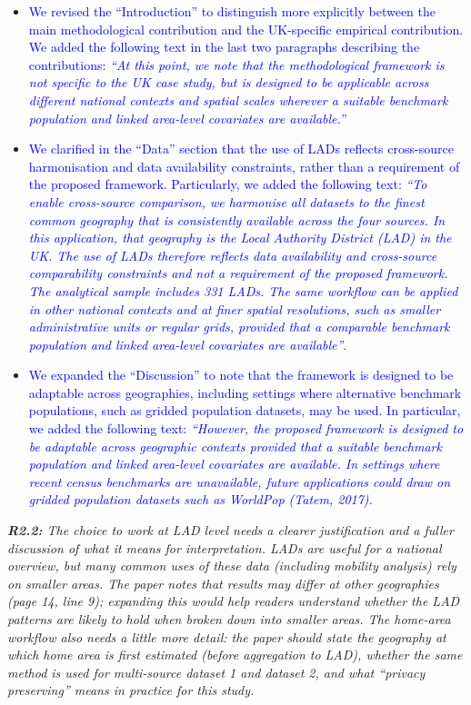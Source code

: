 \documentclass[
  letterpaper,
  DIV=11,
  numbers=noendperiod]{scrartcl}
\begin{document}
\vspace{-3mm} \begin{itemize}[noitemsep, topsep=0pt]
\item \textcolor{blue}{ We revised the ``Introduction'' to distinguish more explicitly between the main methodological contribution and the UK-specific empirical contribution. We added the following text in the last two paragraphs describing the contributions: \textit{``At this point, we note that the methodological framework is not specific to the UK case study, but is designed to be applicable across different national contexts and spatial scales wherever a suitable benchmark population and linked area-level covariates are available.''}}
\item \textcolor{blue}{We clarified in the ``Data'' section that the use of LADs reflects cross-source harmonisation and data availability constraints, rather than a requirement of the proposed framework. Particularly, we added the following text: \textit{``To enable cross-source comparison, we harmonise all datasets to the finest common geography that is consistently available across the four sources. In this application, that geography is the Local Authority District (LAD) in the UK. The use of LADs therefore reflects data availability and cross-source comparability constraints and not a requirement of the proposed framework. The analytical sample includes 331 LADs. The same workflow can be applied in other national contexts and at finer spatial resolutions, such as smaller administrative units or regular grids, provided that a comparable benchmark population and linked area-level covariates are available''}.}
\item \textcolor{blue}{We expanded the ``Discussion'' to note that the framework is designed to be adaptable across geographies, including settings where alternative benchmark populations, such as gridded population datasets, may be used. In particular, we added the following text: \textit{``However, the proposed framework is designed to be adaptable across geographic contexts provided that a suitable benchmark population and linked area-level covariates are available. In settings where recent census benchmarks are unavailable, future applications could draw on gridded population datasets such as WorldPop (Tatem, 2017).}}
\end{itemize}

\setlength{\leftskip}{0cm}\textit{\textbf{R2.2:} The choice to work at LAD level needs a clearer justification and a fuller discussion of what it means for interpretation. LADs are useful for a national overview, but many common uses of these data (including mobility analysis) rely on smaller areas. The paper notes that results may differ at other geographies (page 14, line 9); expanding this would help readers understand whether the LAD patterns are likely to hold when broken down into smaller areas. The home-area workflow also needs a little more detail: the paper should state the geography at which home area is first estimated (before aggregation to LAD), whether the same method is used for multi-source dataset 1 and dataset 2, and what ``privacy preserving'' means in practice for this study.}
\end{document}
